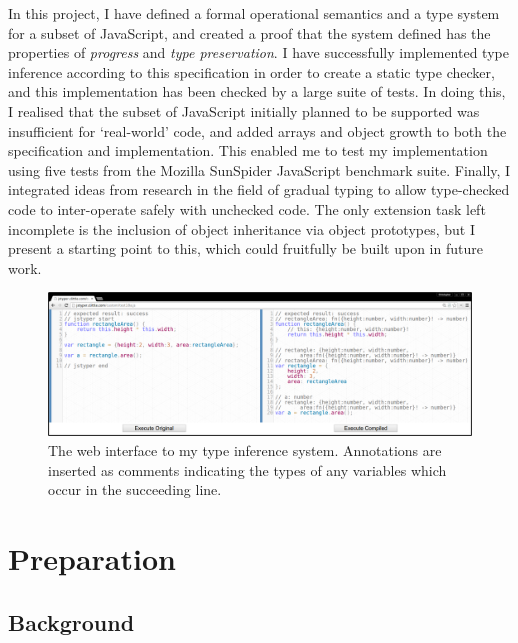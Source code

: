 \documentclass[12pt,a4paper,twoside,openright]{report}
\theoremstyle{definition}
\theoremstyle{dotless}
\begin{document}
In this project, I have defined a formal operational semantics and a type
system for a subset of JavaScript, and created a proof that the system defined
has the properties of \textit{progress} and \textit{type preservation}. I have
successfully implemented type inference according to this specification in
order to create a static type checker, and this implementation has been checked
by a large suite of tests. In doing this, I realised that the subset of
JavaScript initially planned to be supported was insufficient for `real-world'
code, and added arrays and object growth to both the specification and
implementation. This enabled me to test my implementation using five tests from
the Mozilla SunSpider JavaScript benchmark suite. Finally, I integrated ideas
from research in the field of gradual typing to allow type-checked code to
inter-operate safely with unchecked code. The only extension task left
incomplete is the inclusion of object inheritance via object prototypes, but I
present a starting point to this, which could fruitfully be built upon in
future work.

\begin{figure}
  \centering
  \includegraphics[width=160mm]{../res/web-interface.png}
  \caption{The web interface to my type inference system. Annotations are inserted as comments indicating the 
  types of any variables which occur in the succeeding line.}
  \label{fig:web-interface}
\end{figure}






\chapter{Preparation}\label{preparation} 
\section{Background}
\end{document}
